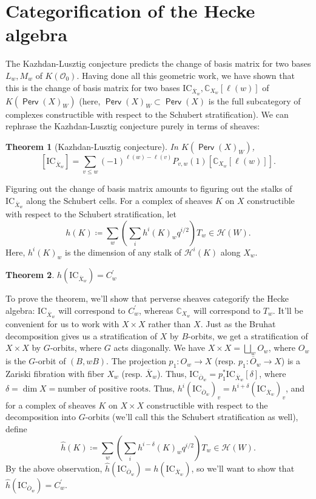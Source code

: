 \documentclass[leqno, openany]{memoir}
\newtheorem{thm}{Theorem}[section]
\theoremstyle{definition}
\theoremstyle{remark}
\theoremstyle{plain}
\theoremstyle{definition}
\theoremstyle{remark}
\newcommand{\mr}[1]{\mathrm{#1}}
\newcommand{\ms}[1]{\mathsf{#1}}
\DeclareMathOperator{\Perv}{\ms{Perv}}
\begin{document}
\section{Categorification of the Hecke algebra}
The Kazhdan-Lusztig conjecture predicts the change of basis matrix for two bases $L_w,M_w$ of $K(\mathcal{O}_0)$. Having done all this geometric work, we have shown that this is the change of basis matrix for two bases $\mr{IC}_{\overline{X}_w},\mathbb{C}_{X_w}[\ell(w)]$ of $K(\Perv(X)_W)$ (here, $\Perv(X)_W \subset \Perv(X)$ is the full subcategory of complexes constructible with respect to the Schubert stratification). We can rephrase the Kazhdan-Lusztig conjecture purely in terms of sheaves:

\begin{thm}[Kazhdan-Lusztig conjecture]
In $K(\Perv(X)_W)$, $$[\mr{IC}_{\overline{X}_w}] = \sum_{v \le w}(-1)^{\ell(w) - \ell(v)}P_{v,w}(1)[\mathbb{C}_{X_w}[\ell(w)]].$$
\end{thm}

Figuring out the change of basis matrix amounts to figuring out the stalks of $\mr{IC}_{\overline{X}_w}$ along the Schubert cells. For a complex of sheaves $K$ on $X$ constructible with respect to the Schubert stratification, let $$h(K) \coloneqq \sum_w\left(\sum_ih^i(K)_wq^{i/2}\right)T_w \in \mathcal{H}(W).$$ Here, $h^i(K)_w$ is the dimension of any stalk of $\mathcal{H}^i(K)$ along $X_w$.

\begin{thm}\label{theorem:hecke_basis}
$h(\mr{IC}_{\overline{X}_w}) = C_w^{\prime}$
\end{thm}

To prove the theorem, we'll show that perverse sheaves categorify the Hecke algebra: $\mr{IC}_{\overline{X}_w}$ will correspond to $C_w^{\prime}$, whereas $\mathbb{C}_{X_w}$ will correspond to $T_w$. It'll be convenient for us to work with $X \times X$ rather than $X$. Just as the Bruhat decomposition gives us a stratification of $X$ by $B$-orbits, we get a stratification of $X \times X$ by $G$-orbits, where $G$ acts diagonally. We have $X \times X = \bigsqcup_wO_w$, where $O_w$ is the $G$-orbit of $(B,wB)$. The projection $p_1: O_w \to X$ (resp. $p_1: \overline{O}_w \to X$) is a Zariski fibration with fiber $X_w$ (resp. $\overline{X}_w$). Thus, $\mr{IC}_{\overline{O}_w} = p_1^*\mr{IC}_{\overline{X}_w}[\delta]$, where $\delta = \dim X = \text{number of positive roots}$. Thus, $h^i(\mr{IC}_{\overline{O}_w})_v = h^{i + \delta}(\mr{IC}_{\overline{X}_w})_v$, and for a complex of sheaves $K$ on $X \times X$ constructible with respect to the decomposition into $G$-orbits (we'll call this the Schubert stratification as well), define $$\widehat{h}(K) \coloneqq \sum_w\left(\sum_ih^{i - \delta}(K)_wq^{i/2}\right)T_w \in \mathcal{H}(W).$$ By the above observation, $\widehat{h}(\mr{IC}_{\overline{O}_w}) = h(\mr{IC}_{\overline{X}_w})$, so we'll want to show that $\widehat{h}(\mr{IC}_{\overline{O}_w}) = C_w^{\prime}$.
\end{document}
